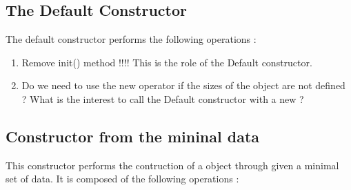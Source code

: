 \subsection{The Default Constructor}

The default constructor performs the following operations :







\begin{ndr}
  \begin{enumerate}
  \item Remove init() method !!!! This is the role of the Default constructor.
  \item Do we need to use the new operator if the sizes of the object are not defined ? What is the interest to call the Default constructor with a new ?
  \end{enumerate}

\end{ndr}

\subsection{Constructor from the mininal data}

This constructor performs  the contruction of a object through given a minimal set of data.  It is composed of the following operations :


